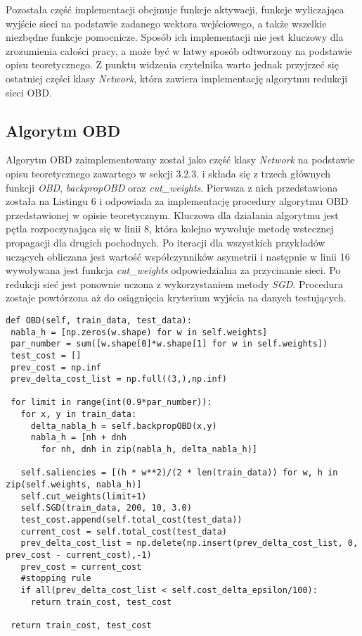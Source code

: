 \par Pozostała część implementacji obejmuje funkcje aktywacji, funkcje wyliczająca wyjście sieci na podstawie zadanego wektora wejściowego, a także wszelkie niezbędne funkcje pomocnicze. Sposób ich implementacji nie jest kluczowy dla zrozumienia całości pracy, a może być w łatwy sposób odtworzony na podstawie opisu teoretycznego. Z punktu widzenia czytelnika warto jednak przyjrzeć się ostatniej części klasy \emph{Network}, która zawiera implementację algorytmu redukcji sieci OBD.

\subsection{Algorytm OBD}
Algorytm OBD zaimplementowany został jako część klasy \emph{Network} na podstawie opisu teoretycznego zawartego w sekcji 3.2.3. i składa się z trzech głównych funkcji \emph{OBD}, \emph{backpropOBD} oraz \emph{cut{\_}weights}. Pierwsza z nich przedstawiona została na Listingu 6 i odpowiada za implementację procedury algorytmu OBD  przedstawionej w opisie teoretycznym. Kluczowa dla działania algorytmu jest pętla rozpoczynająca się w linii 8, która kolejno wywołuje metodę wstecznej propagacji dla drugich pochodnych. Po iteracji dla wszystkich przykładów uczących obliczana jest wartość współczynników asymetrii i następnie w linii 16 wywoływana jest funkcja \emph{cut{\_}weights} odpowiedzialna za przycinanie sieci. Po redukcji sieć jest ponownie uczona z wykorzystaniem metody \emph{SGD}. Procedura zostaje powtórzona aż do osiągnięcia kryterium wyjścia na danych testujących.
\begin{listing}[!htb]
\begin{verbatim}
def OBD(self, train_data, test_data):
 nabla_h = [np.zeros(w.shape) for w in self.weights]
 par_number = sum([w.shape[0]*w.shape[1] for w in self.weights])
 test_cost = []
 prev_cost = np.inf
 prev_delta_cost_list = np.full((3,),np.inf)

 for limit in range(int(0.9*par_number)):
   for x, y in train_data:
     delta_nabla_h = self.backpropOBD(x,y)
     nabla_h = [nh + dnh
       for nh, dnh in zip(nabla_h, delta_nabla_h)]

   self.saliencies = [(h * w**2)/(2 * len(train_data)) for w, h in zip(self.weights, nabla_h)]
   self.cut_weights(limit+1)
   self.SGD(train_data, 200, 10, 3.0)        
   test_cost.append(self.total_cost(test_data))    
   current_cost = self.total_cost(test_data)            
   prev_delta_cost_list = np.delete(np.insert(prev_delta_cost_list, 0, prev_cost - current_cost),-1)
   prev_cost = current_cost
   #stopping rule
   if all(prev_delta_cost_list < self.cost_delta_epsilon/100):
     return train_cost, test_cost 

 return train_cost, test_cost
\end{verbatim}
\end{listing}


